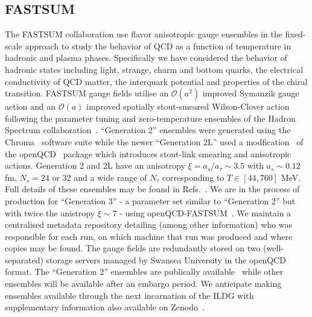 \documentclass[a4paper,11pt]{article}
\begin{document}
\subsection{FASTSUM}
The FASTSUM collaboration use  flavor anisotropic gauge ensembles in the fixed-scale approach to study the behavior of QCD as a function of temperature in hadronic and plasma phases. Specifically we have considered the behavior of hadronic states including light, strange, charm and bottom quarks, the electrical conductivity of QCD matter, the interquark potential and properties of the chiral transition. %
FASTSUM gauge fields utilise an $\mathcal{O}\left(a^2\right)$ improved Symanzik gauge action and an $\mathcal{O}\left(a\right)$ improved spatially stout-smeared Wilson-Clover action following the parameter tuning and zero-temperature ensembles of the Hadron Spectrum collaboration~\cite{Edwards:2008ja,HadronSpectrum:2008xlg}. ``Generation 2'' ensembles were generated using the Chroma~\cite{Edwards:2004sx} software suite while the newer ``Generation 2L'' used a modfication~\cite{glesaaen_jonas_rylund_2018_2216355} of the {\sc openQCD}~\cite{Luscher:2012av,openqcd} package which introduces stout-link smearing and anisotropic actions. Generation 2 and 2L have an anisotropy $\xi = a_s/a_\tau \sim 3.5$ with $a_s\sim 0.12$ fm, $N_s = 24$ or $32$ and a wide range of $N_\tau$ corresponding to $T \in[44,760]$ MeV. %
Full details of these ensembles may be found in Refs.~\cite{Aarts:2014nba,Aarts:2020vyb}. We are in the process of production for ``Generation 3'' - a parameter set similar to ``Generation 2'' but with twice the anistropy $\xi \sim 7$ - using {\sc openQCD-FASTSUM}~\cite{glesaaen_jonas_rylund_2018_2216355}. %
We maintain a centralised metadata repository detailing (among other information) who was responsible for each run, on which machine that run was produced and where copies may be found. The gauge fields are redundantly stored on two (well-separated) storage servers managed by Swansea University in the openQCD format. The ``Generation 2'' ensembles are publically available~\cite{aarts_2024_8403827} while other ensembles will be available after an embargo period. We anticipate making ensembles available through the next incarnation of the ILDG with supplementary information also available on Zenodo~\cite{zenodo,aarts_2024_8403827}.
\end{document}
